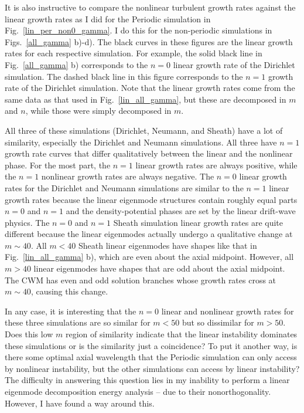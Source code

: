 It is also instructive to compare the nonlinear turbulent growth rates against the linear growth rates as I did for the Periodic simulation in Fig.~\ref{lin_per_non0_gamma}. I do this for
the non-periodic simulations in Figs.~\ref{all_gamma} b)-d). The black curves in these figures are the linear growth rates for each respective simulation. For example, the solid black line in
Fig.~\ref{all_gamma} b) corresponds to the $n=0$ linear growth rate of the Dirichlet simulation. The dashed black line in this figure corresponds to the $n=1$ growth rate of the Dirichlet simulation.
Note that the linear growth rates come from the same data as that used in Fig.~\ref{lin_all_gamma}, but these are decomposed in $m$ and $n$, while those were simply decomposed in $m$.

All three of these simulations (Dirichlet, Neumann, and Sheath) have a lot of similarity, especially the Dirichlet and Neumann simulations. All three have $n=1$ growth
rate curves that differ qualitatively between the linear and the nonlinear phase. For the most part, the $n=1$ linear growth rates are always positive, while
the $n=1$ nonlinear growth rates are always negative. The $n=0$ linear growth rates for the Dirichlet and Neumann simulations are similar to the $n=1$ linear growth rates because the linear
eigenmode structures contain roughly equal parts $n=0$ and $n=1$ and the density-potential phases are set by the linear drift-wave physics. The $n=0$ and $n=1$ Sheath simulation linear
growth rates are quite different because the linear eigenmodes actually undergo a qualitative change at $m \sim 40$. 
All $m <40$ Sheath linear eigenmodes have shapes like that in Fig.~\ref{lin_all_gamma} b),
which are even about the axial midpoint. However, all $m>40$ linear eigenmodes have shapes that are odd about the axial midpoint. The CWM has even and odd solution branches whose growth rates
cross at $m \sim 40$, causing this change.

In any case, it is interesting that the $n=0$ linear and nonlinear growth rates for these three simulations are so similar for $m<50$ but so dissimilar for $m>50$. 
Does this low $m$ region of similarity indicate that the linear instability dominates these simulations or is the similarity just a coincidence? To put it another way, 
is there some optimal axial wavelength that the Periodic simulation can only access by nonlinear instability, but the other simulations can access by linear instability?
The difficulty in answering this question lies in my inability to perform a linear eigenmode decomposition energy analysis -- due to their nonorthogonality. However, I have found a way
around this.

